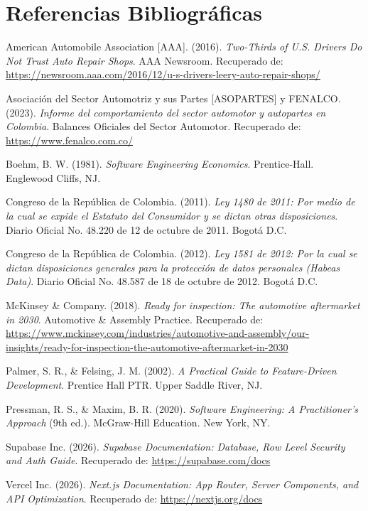 \documentclass[11pt,letterpaper]{article}
\makeatletter
\newenvironment{hangparas}[2]{\setlength{\parindent}{\z@}\everypar{\parindent#1\hangindent#2}}{\par}
\makeatother
\begin{document}
\newpage

\section{Referencias Bibliográficas}

\begin{hangparas}{.6cm}{1}
American Automobile Association [AAA]. (2016). \textit{Two-Thirds of U.S. Drivers Do Not Trust Auto Repair Shops}. AAA Newsroom. Recuperado de: \url{https://newsroom.aaa.com/2016/12/u-s-drivers-leery-auto-repair-shops/}

\vspace{0.25cm}
Asociación del Sector Automotriz y sus Partes [ASOPARTES] y FENALCO. (2023). \textit{Informe del comportamiento del sector automotor y autopartes en Colombia}. Balances Oficiales del Sector Automotor. Recuperado de: \url{https://www.fenalco.com.co/}

\vspace{0.25cm}
Boehm, B. W. (1981). \textit{Software Engineering Economics}. Prentice-Hall. Englewood Cliffs, NJ.

\vspace{0.25cm}
Congreso de la República de Colombia. (2011). \textit{Ley 1480 de 2011: Por medio de la cual se expide el Estatuto del Consumidor y se dictan otras disposiciones}. Diario Oficial No. 48.220 de 12 de octubre de 2011. Bogotá D.C.

\vspace{0.25cm}
Congreso de la República de Colombia. (2012). \textit{Ley 1581 de 2012: Por la cual se dictan disposiciones generales para la protección de datos personales (Habeas Data)}. Diario Oficial No. 48.587 de 18 de octubre de 2012. Bogotá D.C.

\vspace{0.25cm}
McKinsey \& Company. (2018). \textit{Ready for inspection: The automotive aftermarket in 2030}. Automotive \& Assembly Practice. Recuperado de: \url{https://www.mckinsey.com/industries/automotive-and-assembly/our-insights/ready-for-inspection-the-automotive-aftermarket-in-2030}

\vspace{0.25cm}
Palmer, S. R., \& Felsing, J. M. (2002). \textit{A Practical Guide to Feature-Driven Development}. Prentice Hall PTR. Upper Saddle River, NJ.

\vspace{0.25cm}
Pressman, R. S., \& Maxim, B. R. (2020). \textit{Software Engineering: A Practitioner's Approach} (9th ed.). McGraw-Hill Education. New York, NY.

\vspace{0.25cm}
Supabase Inc. (2026). \textit{Supabase Documentation: Database, Row Level Security and Auth Guide}. Recuperado de: \url{https://supabase.com/docs}

\vspace{0.25cm}
Vercel Inc. (2026). \textit{Next.js Documentation: App Router, Server Components, and API Optimization}. Recuperado de: \url{https://nextjs.org/docs}
\end{hangparas}
\end{document}
